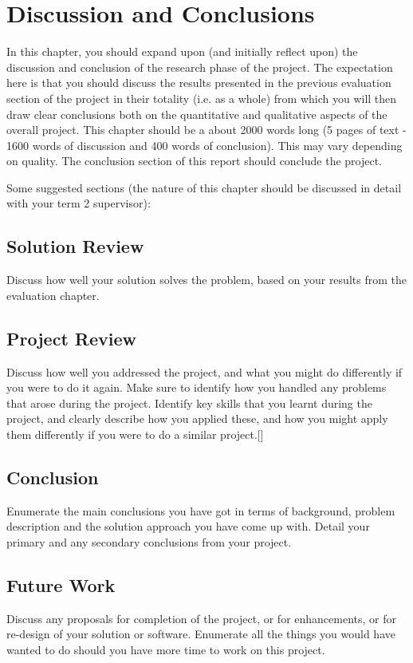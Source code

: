 \chapter{Discussion and Conclusions}
\label{chap:conclusions}
In this chapter, you should expand upon (and initially reflect upon) the discussion and conclusion of the research phase of the project. The expectation here is that you should discuss the results presented in the previous evaluation section of the project in their totality (i.e. as a whole) from which you will then draw clear conclusions both on the quantitative and qualitative aspects of the overall project. This chapter should be a about 2000 words long (5 pages of text - 1600 words of discussion and 400 words of conclusion). This may vary depending on quality. The conclusion section of this report should conclude the project.

Some suggested sections (the nature of this chapter should be discussed in detail with your term 2 supervisor):

\section{Solution Review}
Discuss how well your solution solves the problem, based on your results from the evaluation chapter.

\section{Project Review}
Discuss how well you addressed the project, and what you might do differently if you were to do it again. Make sure to identify how you handled any problems that arose during the project. Identify key skills that you learnt during the project, and clearly describe how you applied these, and how you might apply them differently if you were to do a similar project.[]

\section{Conclusion}
Enumerate the main conclusions you have got in terms of background, problem description and the solution approach you have come up with. Detail your primary and any secondary conclusions from your project.

\section{Future Work}
Discuss any proposals for completion of the project, or for enhancements, or for re-design of your solution or software. Enumerate all the things you would have wanted to do should you have more time to work on this project.